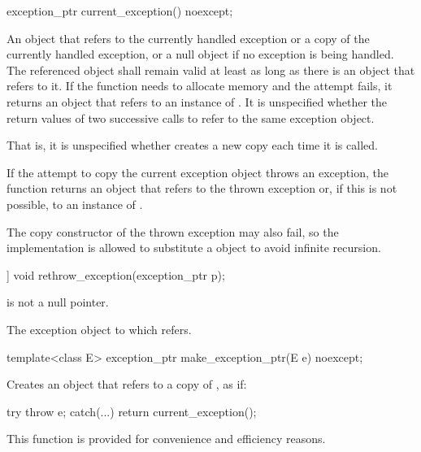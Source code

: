 %
\begin{itemdecl}
exception_ptr current_exception() noexcept;
\end{itemdecl}

\begin{itemdescr}
\pnum
\returns
An  object that refers to
the currently handled exception or a copy of the currently
handled exception, or a null  object if no exception is being
handled. The referenced object shall remain valid at least as long as there is an
 object that refers to it.
If the function needs to allocate memory and the attempt fails, it returns an
 object that refers to an instance of .
It is unspecified whether the return values of two successive calls to
 refer to the same exception object.
\begin{note}
That is, it is unspecified whether 
creates a new copy each time it is called.
\end{note}
If the attempt to copy the current exception object throws an exception, the function
returns an  object that refers to the thrown exception or,
if this is not possible, to an instance of .
\begin{note}
The
copy constructor of the thrown exception may also fail, so the implementation is allowed
to substitute a  object to avoid infinite
recursion.
\end{note}
\end{itemdescr}

%
\begin{itemdecl}
[[noreturn]] void rethrow_exception(exception_ptr p);
\end{itemdecl}

\begin{itemdescr}
\pnum
\expects
{} is not a null pointer.

\pnum
\throws
The exception object to which  refers.
\end{itemdescr}

%
\begin{itemdecl}
template<class E> exception_ptr make_exception_ptr(E e) noexcept;
\end{itemdecl}

\begin{itemdescr}
\pnum
\effects
Creates an  object that refers to a copy of , as if:
\begin{codeblock}
try {
  throw e;
} catch(...) {
  return current_exception();
}
\end{codeblock}

\pnum
\begin{note}
This function is provided for convenience and
efficiency reasons.
\end{note}
\end{itemdescr}

